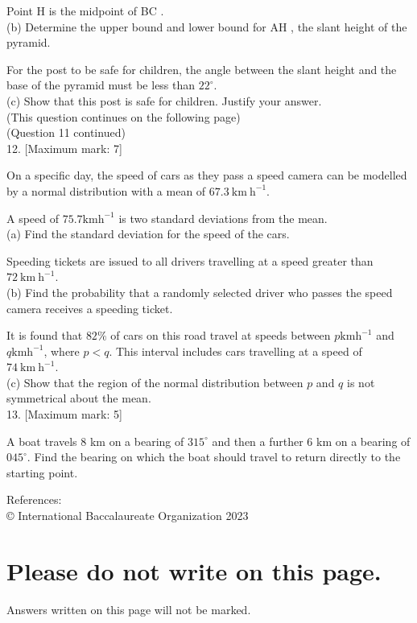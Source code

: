 \documentclass[10pt]{article}
\begin{document}
Point H is the midpoint of BC .\\
(b) Determine the upper bound and lower bound for AH , the slant height of the pyramid.

For the post to be safe for children, the angle between the slant height and the base of the pyramid must be less than $22^{\circ}$.\\
(c) Show that this post is safe for children. Justify your answer.\\
(This question continues on the following page)\\
(Question 11 continued)\\[0pt]
12. [Maximum mark: 7]

On a specific day, the speed of cars as they pass a speed camera can be modelled by a normal distribution with a mean of $67.3 \mathrm{~km} \mathrm{~h}^{-1}$.

A speed of $75.7 \mathrm{kmh}^{-1}$ is two standard deviations from the mean.\\
(a) Find the standard deviation for the speed of the cars.

Speeding tickets are issued to all drivers travelling at a speed greater than $72 \mathrm{~km} \mathrm{~h}^{-1}$.\\
(b) Find the probability that a randomly selected driver who passes the speed camera receives a speeding ticket.

It is found that $82 \%$ of cars on this road travel at speeds between $p \mathrm{kmh}^{-1}$ and $q \mathrm{kmh}^{-1}$, where $p<q$. This interval includes cars travelling at a speed of $74 \mathrm{~km} \mathrm{~h}^{-1}$.\\
(c) Show that the region of the normal distribution between $p$ and $q$ is not symmetrical about the mean.\\[0pt]
13. [Maximum mark: 5]

A boat travels 8 km on a bearing of $315^{\circ}$ and then a further 6 km on a bearing of $045^{\circ}$. Find the bearing on which the boat should travel to return directly to the starting point.

References:\\
© International Baccalaureate Organization 2023

\section*{Please do not write on this page.}
Answers written on this page will not be marked.
\end{document}
